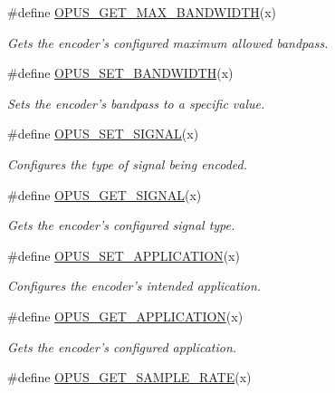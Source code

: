 \begin{DoxyCompactItemize}
\#define \hyperlink{group__opus__encoderctls_gaa3b5736de64792e1144ce12dfb87613c}{OPUS\_\-GET\_\-MAX\_\-BANDWIDTH}(x)
\begin{DoxyCompactList}\small\item\em Gets the encoder's configured maximum allowed bandpass. \item\end{DoxyCompactList}\item 
\#define \hyperlink{group__opus__encoderctls_ga0178dabe5526d5b0667d81489cc93791}{OPUS\_\-SET\_\-BANDWIDTH}(x)
\begin{DoxyCompactList}\small\item\em Sets the encoder's bandpass to a specific value. \item\end{DoxyCompactList}\item 
\#define \hyperlink{group__opus__encoderctls_gaaa87ccee4ae46aa6c9528e03c5122b89}{OPUS\_\-SET\_\-SIGNAL}(x)
\begin{DoxyCompactList}\small\item\em Configures the type of signal being encoded. \item\end{DoxyCompactList}\item 
\#define \hyperlink{group__opus__encoderctls_ga640d434de535e2d2caec991c347303a4}{OPUS\_\-GET\_\-SIGNAL}(x)
\begin{DoxyCompactList}\small\item\em Gets the encoder's configured signal type. \item\end{DoxyCompactList}\item 
\#define \hyperlink{group__opus__encoderctls_ga18fa17dae52ff8f3eaea314204bf1a36}{OPUS\_\-SET\_\-APPLICATION}(x)
\begin{DoxyCompactList}\small\item\em Configures the encoder's intended application. \item\end{DoxyCompactList}\item 
\#define \hyperlink{group__opus__encoderctls_ga062ebbc209caf6832fe4a309a459fd4c}{OPUS\_\-GET\_\-APPLICATION}(x)
\begin{DoxyCompactList}\small\item\em Gets the encoder's configured application. \item\end{DoxyCompactList}\item 
\#define \hyperlink{group__opus__encoderctls_gac8ad425424211faae6a0fbfb7c28bb51}{OPUS\_\-GET\_\-SAMPLE\_\-RATE}(x)

\end{DoxyCompactItemize}
